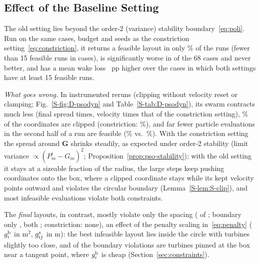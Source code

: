 \subsection{Effect of the Baseline Setting}
\label{sec:psosetting}
\label{sec:baseline}
The old setting lies beyond the order-2 (variance) stability boundary~\eqref{eq:poli}. Run on the same cases, budget and seeds as the constriction setting~\eqref{eq:constriction}, it returns a feasible layout in only \NOldPSOFeas\% of the runs (fewer than 15 feasible runs in \NOldPSOBelowHalf{} cases), is significantly worse in \NOldPSOWorse{} of the 68 cases and never better, and has a mean wake loss \NOldPSODL{}~pp higher over the \NOldPSOCases{} cases in which both settings have at least 15 feasible runs.

\emph{What goes wrong.} In instrumented reruns (clipping without velocity reset or clamping; Fig.~\ref{S-fig:D-psodyn} and Table~\ref{S-tab:D-psodyn}), its swarm contracts much less (final spread \NDSpreadRatio{} times, velocity \NDVelRatio{} times that of the constriction setting), \NDClipOld\% of the coordinates are clipped (constriction: \NDClipNew\%), and far fewer particle evaluations in the second half of a run are feasible (\NDFeasPartOld\% vs.\ \NDFeasPartNew\%). With the constriction setting the spread around $\mathbf G$ shrinks steadily, as expected under order-2 stability (limit variance $\propto(P^i_m-G_m)^2$; Proposition~\ref{prop:pso-stability}); with the old setting it stays at a sizeable fraction of the radius, the large steps keep pushing coordinates onto the box, where a clipped coordinate stays while its kept velocity points outward and violates the circular boundary (Lemma~\ref{S-lem:S-clip}), and most infeasible evaluations violate both constraints.

The \emph{final} layouts, in contrast, mostly violate only the spacing (\NDStoredSpacingOnlyOld{} of \NDStoredInfeasOld; boundary only \NDStoredBoundOnlyOld, both \NDStoredBothOld; constriction: none), an effect of the penalty scaling in~\eqref{eq:penalty} ($g^{\rm b}_i$ in m$^2$, $g^{\rm s}_{ij}$ in m): the best infeasible layout lies inside the circle with turbines slightly too close, and \NDStoredTangentOld{} of the \NDStoredAnyBoundOld{} boundary violations are turbines pinned at the box near a tangent point, where $g^{\rm b}_i$ is cheap (Section~\ref{sec:constraints}).

